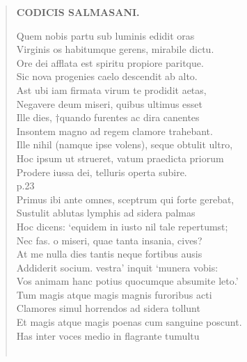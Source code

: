 \documentclass[11pt, a4paper]{report}
\begin{document}
\begin{verse}
    \begin{center} \textbf{CODICIS SALMASANI.} \end{center} \marginpar{[57]} Quem nobis partu sub luminis edidit oras \\ Virginis os habitumque gerens, mirabile dictu. \\ Ore  \lbrack dei \rbrack  afflata est spiritu propiore paritque. \\ Sic nova progenies caelo descendit ab alto. \\ Ast ubi iam firmata virum te prodidit aetas, \\ Negavere deum miseri, quibus ultimus esset \\ Ille dies, †quando furentes ac dira canentes \\ Insontem magno ad regem clamore trahebant. \\ Ille nihil (namque ipse volens), seque obtulit ultro, \\ Hoc ipsum ut strueret, vatum praedicta priorum \\ Prodere iussa dei, telluris operta subire. \\ p.23 \\ Primus ibi ante omnes, sceptrum qui forte gerebat, \\ Sustulit ablutas lymphis ad sidera palmas \\ Hoc dicens: ‘equidem in iusto nil tale repertumst; \\ Nec fas. o miseri, quae tanta insania, cives? \\  \lbrack At \rbrack  me nulla dies tantis neque fortibus ausis \\ Addiderit socium. vestra’ inquit ‘munera vobis: \\ Vos animam hanc potius quocumque absumite leto.’ \\ Tum magis atque magis magnis furoribus acti \\ Clamores simul horrendos ad sidera tollunt \\ Et magis atque magis poenas cum sanguine poscunt. \\ Has inter voces medio in flagrante tumultu \\ 
        ﻿\pagebreak 

\end{verse}
\end{document}
